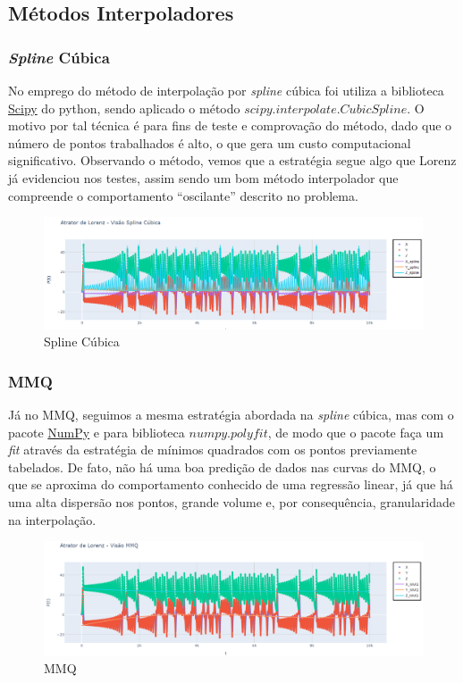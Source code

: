 \documentclass[12pt, a4paper]{article}
\begin{document}
\subsection{Métodos Interpoladores}
\subsubsection{\textit{Spline} Cúbica}

No emprego do método de interpolação por \textit{spline} cúbica foi
utiliza a biblioteca \href{https://docs.scipy.org/doc/scipy/index.html}{Scipy}
do python, sendo aplicado o método $scipy.interpolate.CubicSpline$. O motivo
por tal técnica é para fins de teste e comprovação do método, dado que o número
de pontos trabalhados é alto, o que gera um custo computacional significativo.
Observando o método, vemos que a estratégia segue algo que Lorenz já evidenciou
nos testes, assim sendo um bom método interpolador que compreende o
comportamento ``oscilante'' descrito no problema.

\begin{figure}[H]
    \centering
    \includegraphics[width=\textwidth]{img/spline.png}
    \caption{Spline Cúbica}
    \label{fig:spline}
\end{figure}

\subsubsection{MMQ}
Já no MMQ, seguimos a mesma estratégia abordada na \textit{spline}
cúbica, mas com o pacote \href{https://numpy.org/doc/stable/index.html}{NumPy}
e para biblioteca $numpy.polyfit$, de modo que o pacote faça um \textit{fit}
através da estratégia de mínimos quadrados com os pontos previamente tabelados.
De fato, não há uma boa predição de dados nas curvas do MMQ, o que se aproxima
do comportamento conhecido de uma regressão linear, já que há uma alta
dispersão nos pontos, grande volume e, por consequência, granularidade na
interpolação.
\begin{figure}[H]
    \centering
    \includegraphics[width=\textwidth]{img/mmq.png}
    \caption{MMQ}
    \label{fig:mmq}
\end{figure}
\end{document}
